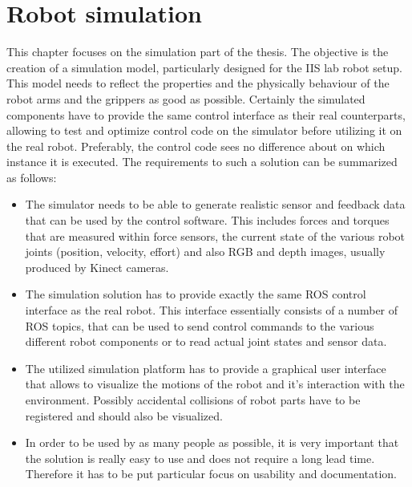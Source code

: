
\chapter{Robot simulation}
\label{chap:simulation}

This chapter focuses on the simulation part of the thesis. The objective is the creation of a simulation model, particularly designed for the IIS lab robot setup. This model needs to reflect the properties and the physically behaviour of the robot arms and the grippers as good as possible. Certainly the simulated components have to provide the same control interface as their real counterparts, allowing to test and optimize control code on the simulator before utilizing it on the real robot. Preferably, the control code sees no difference about on which instance it is executed. The requirements to such a solution can be summarized as follows: 

\begin{itemize}

\item
The simulator needs to be able to generate realistic sensor and feedback data that can be used by the control software. This includes forces and torques that are measured within force sensors, the current state of the various robot joints (position, velocity, effort) and also RGB and depth images, usually produced by Kinect cameras.

\item
The simulation solution has to provide exactly the same ROS control interface as the real robot. This interface essentially consists of a number of ROS topics, that can be used to send control commands to the various different robot components or to read actual joint states and sensor data.
 
\item
The utilized simulation platform has to provide a graphical user interface that allows to visualize the motions of the robot and it's interaction with the environment. Possibly accidental collisions of  robot parts have to be registered and should also be visualized.

\item
In order to be used by as many people as possible, it is very important that the solution is really easy to use and does not require a long lead time. Therefore it has to be put particular focus on usability and documentation.

\end{itemize}

